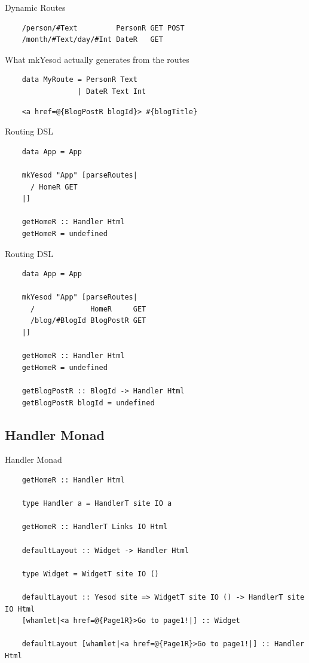 \documentclass[pdf]{beamer}
\begin{document}
\begin{frame}[fragile]{Dynamic Routes}
  \begin{verbatim}
    /person/#Text         PersonR GET POST
    /month/#Text/day/#Int DateR   GET
  \end{verbatim}
\end{frame}

\begin{frame}{What mkYesod actually generates from the routes}
  \begin{verbatim}
    data MyRoute = PersonR Text
                 | DateR Text Int
  \end{verbatim}
  \pause
  \begin{verbatim}
    <a href=@{BlogPostR blogId}> #{blogTitle}
  \end{verbatim}
\end{frame}

\begin{frame}[fragile]{Routing DSL}
  \begin{verbatim}
    data App = App

    mkYesod "App" [parseRoutes|
      / HomeR GET
    |]

    getHomeR :: Handler Html
    getHomeR = undefined
  \end{verbatim}
\end{frame}

\begin{frame}[fragile]{Routing DSL}
  \begin{verbatim}
    data App = App

    mkYesod "App" [parseRoutes|
      /             HomeR     GET
      /blog/#BlogId BlogPostR GET
    |]

    getHomeR :: Handler Html
    getHomeR = undefined

    getBlogPostR :: BlogId -> Handler Html
    getBlogPostR blogId = undefined
  \end{verbatim}
\end{frame}

\subsection{Handler Monad}
\begin{frame}[fragile]{Handler Monad}
  \begin{verbatim}
    getHomeR :: Handler Html

    type Handler a = HandlerT site IO a

    getHomeR :: HandlerT Links IO Html

    defaultLayout :: Widget -> Handler Html

    type Widget = WidgetT site IO ()

    defaultLayout :: Yesod site => WidgetT site IO () -> HandlerT site IO Html
    [whamlet|<a href=@{Page1R}>Go to page1!|] :: Widget

    defaultLayout [whamlet|<a href=@{Page1R}>Go to page1!|] :: Handler Html
  \end{verbatim}
\end{frame}
\end{document}
